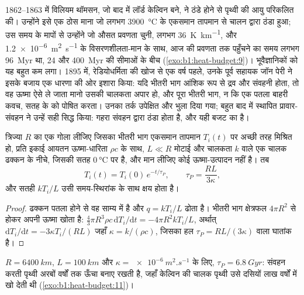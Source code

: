 \begin{history}[जॉन पेरी और शीतल होती पृथ्वी]
1862--1863 में विलियम थॉमसन, जो बाद में लॉर्ड केल्विन बने, ने ठंडे होने से पृथ्वी की आयु परिकलित की। उन्होंने इसे एक ठोस माना जो लगभग \qty{3900}{\degreeCelsius} के एकसमान तापमान से चालन द्वारा ठंडा हुआ; उस समय के मापों से उन्होंने जो औसत प्रवणता चुनी, लगभग \qty{36}{K.km^{-1}}, और \qty{1.2e-6}{m^2.s^{-1}} के विसरणशीलता-मान के साथ, आज की प्रवणता तक पहुँचने का समय लगभग \qty{96}{Myr} था, 24 और \qty{400}{Myr} की सीमाओं के बीच (\cref{exo:b1:heat-budget:9})। भूवैज्ञानिकों को यह बहुत कम लगा। 1895 में, रेडियोधर्मिता की खोज से एक वर्ष पहले, उनके पूर्व सहायक जॉन पेरी ने इसके बजाय एक धारणा की ओर इशारा किया: यदि भीतरी भाग आंशिक रूप से द्रव और संवहनी होता, तो वह ऊष्मा ऐसे ले जाता मानो उसकी चालकता अपार हो, और पूरा भीतरी भाग, न कि एक पतला बाहरी कवच, सतह के  को पोषित करता। उनका तर्क उपेक्षित और भुला दिया गया; बहुत बाद में स्थापित प्रावार-संवहन ने उन्हें सही सिद्ध किया: गहरा  संवहन द्वारा ठंडा होता है, और यही बजट का  है। %
\end{history}

\begin{proposition}[पेरी की अच्छी तरह मिश्रित पृथ्वी]\label{prop:b1:heat-budget:perry}
त्रिज्या $R$ का एक गोला लीजिए जिसका भीतरी भाग एकसमान तापमान $T_i(t)$ पर अच्छी तरह मिश्रित हो, प्रति इकाई आयतन ऊष्मा-धारिता $\rho c$ के साथ, $L \ll R$ मोटाई और चालकता $k$ वाले एक चालक ढक्कन के नीचे, जिसकी सतह $\qty{0}{\degreeCelsius}$ पर है, और मान लीजिए कोई ऊष्मा-उत्पादन नहीं है। तब
\[
  T_i(t) = T_i(0)\,e^{-t/\tau_P}, \qquad \tau_P = \frac{RL}{3\kappa},
\]
और सतही  $kT_i/L$ उसी समय-स्थिरांक के साथ क्षय होता है।
\end{proposition}

\begin{proof}
ढक्कन पतला होने से वह साम्य में है और  $q = kT_i/L$ ढोता है। भीतरी भाग क्षेत्रफल $4\pi R^2$ से होकर अपनी ऊष्मा खोता है: $\tfrac43\pi R^3\rho c\,\mathrm dT_i/\mathrm dt = -4\pi R^2 kT_i/L$, अर्थात् $\mathrm dT_i/\mathrm dt = -3\kappa T_i/(RL)$ जहाँ $\kappa = k/(\rho c)$, जिसका हल $\tau_P = RL/(3\kappa)$ वाला घातांक है।
\end{proof}

$R = \qty{6400}{km}$, $L = \qty{100}{km}$ और $\kappa =
\qty{e-6}{m^2.s^{-1}}$ के लिए, $\tau_P = \qty{6.8}{Gyr}$: संवहन करती पृथ्वी अरबों वर्षों तक ऊँचा  बनाए रखती है, जहाँ केल्विन की चालक पृथ्वी उसे दसियों लाख वर्षों में खो देती थी (\cref{exo:b1:heat-budget:11})।

